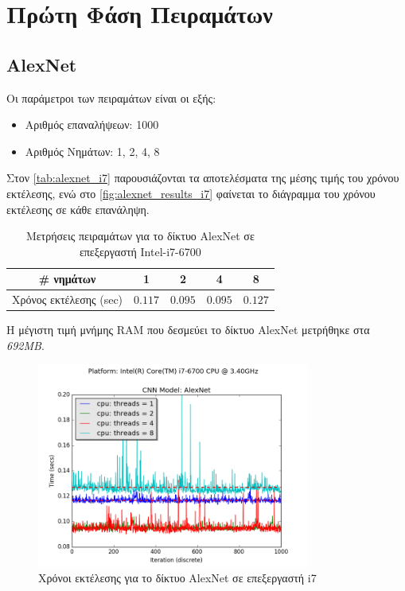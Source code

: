 \section{Πρώτη Φάση Πειραμάτων}
\label{sec:experiments_phase1}

\subsection{AlexNet}

Οι παράμετροι των πειραμάτων είναι οι εξής:
\begin{itemize}
  \item{Αριθμός επαναλήψεων: 1000}
  \item{Αριθμός Νημάτων: 1, 2, 4, 8}
\end{itemize}

Στον \autoref{tab:alexnet_i7} παρουσιάζονται τα αποτελέσματα της μέσης τιμής
του χρόνου εκτέλεσης, ενώ στο \autoref{fig:alexnet_results_i7} φαίνεται
το διάγραμμα του χρόνου εκτέλεσης σε κάθε επανάληψη.

\begin{table}[H]
  \begin{center}
    \caption{Μετρήσεις πειραμάτων για το δίκτυο AlexNet σε επεξεργαστή Intel-i7-6700}
    \label{tab:alexnet_i7}
    \begin{tabular}{ | c | c | c | c | c | }
      \hline
      \rowcolor{Gray}
      \# νημάτων & 1 & 2 & 4 & 8 \\
      \hline
      Χρόνος εκτέλεσης (sec) & $0.117$ & $0.095$ & $0.095$ & $0.127$ \\
      \hline
    \end{tabular}
  \end{center}
\end{table}

Η μέγιστη τιμή μνήμης RAM που δεσμεύει το δίκτυο AlexNet μετρήθηκε στα \emph{692MB}.

\begin{figure}[H]
  \centering
  \includegraphics[width=0.8\textwidth]{./images/chapter6/benchmark_alexnet_i7.png}
  \caption[Χρόνoι εκτέλεσης για το δίκτυο AlexNet σε επεξεργαστή i7]{Χρόνοι εκτέλεσης για το δίκτυο AlexNet σε επεξεργαστή i7}
  \label{fig:alexnet_results_i7}
\end{figure}



